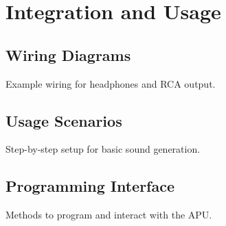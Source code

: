 \section{Integration and Usage}
\subsection{Wiring Diagrams}
Example wiring for headphones and RCA output.
\subsection{Usage Scenarios}
Step-by-step setup for basic sound generation.
\subsection{Programming Interface}
Methods to program and interact with the APU.